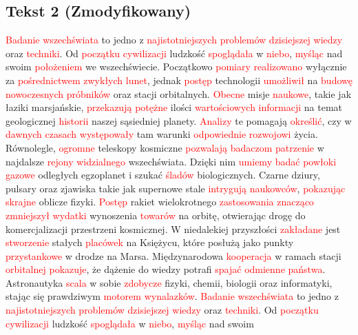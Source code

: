 \documentclass[12pt,a4paper]{article}
\begin{document}
\subsection{Tekst 2 (Zmodyfikowany)}
\textcolor{red}{Badanie} \textcolor{red}{wszechświata} to jedno z \textcolor{red}{najistotniejszych} \textcolor{red}{problemów} \textcolor{red}{dzisiejszej} \textcolor{red}{wiedzy} oraz \textcolor{red}{techniki}. Od \textcolor{red}{początku} \textcolor{red}{cywilizacji} ludzkość \textcolor{red}{spoglądała} w \textcolor{red}{niebo}, \textcolor{red}{myśląc} nad swoim \textcolor{red}{położeniem} we wszechświecie. Początkowo \textcolor{red}{pomiary} \textcolor{red}{realizowano} wyłącznie za \textcolor{red}{pośrednictwem} \textcolor{red}{zwykłych} \textcolor{red}{lunet}, jednak \textcolor{red}{postęp} technologii \textcolor{red}{umożliwił} na \textcolor{red}{budowę} \textcolor{red}{nowoczesnych} \textcolor{red}{próbników} oraz stacji orbitalnych. \textcolor{red}{Obecne} misje \textcolor{red}{naukowe}, takie jak łaziki marsjańskie, \textcolor{red}{przekazują} \textcolor{red}{potężne} ilości \textcolor{red}{wartościowych} \textcolor{red}{informacji} na temat geologicznej \textcolor{red}{historii} naszej sąsiedniej planety. \textcolor{red}{Analizy} te pomagają \textcolor{red}{określić}, czy w \textcolor{red}{dawnych} \textcolor{red}{czasach} \textcolor{red}{występowały} tam warunki \textcolor{red}{odpowiednie} \textcolor{red}{rozwojowi} życia. Równolegle, \textcolor{red}{ogromne} teleskopy kosmiczne \textcolor{red}{pozwalają} \textcolor{red}{badaczom} \textcolor{red}{patrzenie} w najdalsze \textcolor{red}{rejony} \textcolor{red}{widzialnego} wszechświata. Dzięki nim \textcolor{red}{umiemy} \textcolor{red}{badać} \textcolor{red}{powłoki} \textcolor{red}{gazowe} odległych egzoplanet i szukać \textcolor{red}{śladów} biologicznych. Czarne dziury, pulsary oraz zjawiska takie jak supernowe stale \textcolor{red}{intrygują} \textcolor{red}{naukowców}, \textcolor{red}{pokazując} \textcolor{red}{skrajne} oblicze fizyki. \textcolor{red}{Postęp} rakiet wielokrotnego \textcolor{red}{zastosowania} \textcolor{red}{znacząco} \textcolor{red}{zmniejszył} \textcolor{red}{wydatki} wynoszenia \textcolor{red}{towarów} na orbitę, otwierając drogę do komercjalizacji przestrzeni kosmicznej. W niedalekiej przyszłości \textcolor{red}{zakładane} jest \textcolor{red}{stworzenie} stałych \textcolor{red}{placówek} na Księżycu, które posłużą jako punkty \textcolor{red}{przystankowe} w drodze na Marsa. Międzynarodowa \textcolor{red}{kooperacja} w ramach stacji \textcolor{red}{orbitalnej} \textcolor{red}{pokazuje}, że dążenie do wiedzy potrafi \textcolor{red}{spajać} \textcolor{red}{odmienne} \textcolor{red}{państwa}. Astronautyka \textcolor{red}{scala} w sobie \textcolor{red}{zdobycze} fizyki, chemii, biologii oraz informatyki, stając się prawdziwym \textcolor{red}{motorem} \textcolor{red}{wynalazków}. \textcolor{red}{Badanie} \textcolor{red}{wszechświata} to jedno z \textcolor{red}{najistotniejszych} \textcolor{red}{problemów} \textcolor{red}{dzisiejszej} \textcolor{red}{wiedzy} oraz \textcolor{red}{techniki}. Od \textcolor{red}{początku} \textcolor{red}{cywilizacji} ludzkość \textcolor{red}{spoglądała} w \textcolor{red}{niebo}, \textcolor{red}{myśląc} nad swoim 
\end{document}
